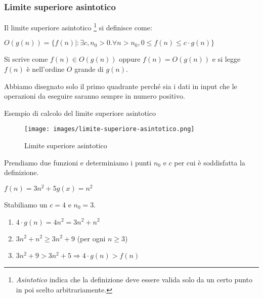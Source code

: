 \subsubsection{Limite superiore asintotico}
\begin{definition}
Il limite superiore asintotico \footnote{\emph{Asintotico} indica che la definizione deve essere valida solo da un certo punto in poi scelto arbitrariamente.} si definisce come:
\begin{center}
    $O(g(n)) = \{f(n) \mid: \exists c, n_0 > 0 . \forall n > n_0, 0 \leq f(n) \leq c \cdot g(n)\}$
\end{center}
\end{definition}
\hspace{-15pt}Si scrive come $f(n) \in O(g(n))$ oppure $f(n) = O(g(n))$ e si legge $f(n)$ è nell'ordine $O$ grande di $g(n)$.
\begin{note}
	Abbiamo disegnato solo il primo quadrante perché sia i dati in input che le operazioni da eseguire saranno sempre in numero positivo.
\end{note}
\begin{example}
Esempio di calcolo del limite superiore asintotico
\end{example}
\begin{wrapfigure}[7]{l}{8cm}
    \vspace{-15pt}
    \centering
    \texttt{[image: images/limite-superiore-asintotico.png]}
    \vspace{-5pt}
    \caption{Limite superiore asintotico}
\end{wrapfigure}
Prendiamo due funzioni e determiniamo i punti $n_0$ e $c$ per cui è soddisfatta la definizione.
\begin{center}
    \vspace{-5pt}
    $f(n) = 3n^2 + 5$\hspace{30pt}$g(x)=n^2$
\end{center}
Stabiliamo un $c = 4$ e $n_0 = 3$.
\begin{enumerate}
    \item $4 \cdot g(n) = 4n^2 = 3n^2 + n^2 $
    \item $3n^2 + n^2 \geq 3n^2 + 9 $ (per ogni $n \geq 3$)
    \item $3n^2 + 9 > 3n^2+5 \Longrightarrow 4 \cdot g(n) > f(n)$
\end{enumerate}

